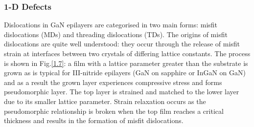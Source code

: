 \subsubsection{1-D Defects}
Dislocations in GaN epilayers are categorised in two main forms: misfit dislocations (MDs) and threading dislocations (TDs). The origins of misfit dislocations are quite well understood: they occur through the release of misfit strain at interfaces between two crystals of differing lattice constants. The process is shown in Fig.\ref{1.7}: a film with a lattice parameter greater than the substrate is grown as is typical for III-nitride epilayers (GaN on sapphire or InGaN on GaN) and as a result the grown layer experiences compressive stress and forms pseudomorphic layer. The top layer is strained and matched to the lower layer due to its smaller lattice parameter. Strain relaxation occurs as the pseudomorphic relationship is broken when the top film reaches a critical thickness and results in the formation of misfit dislocations.

